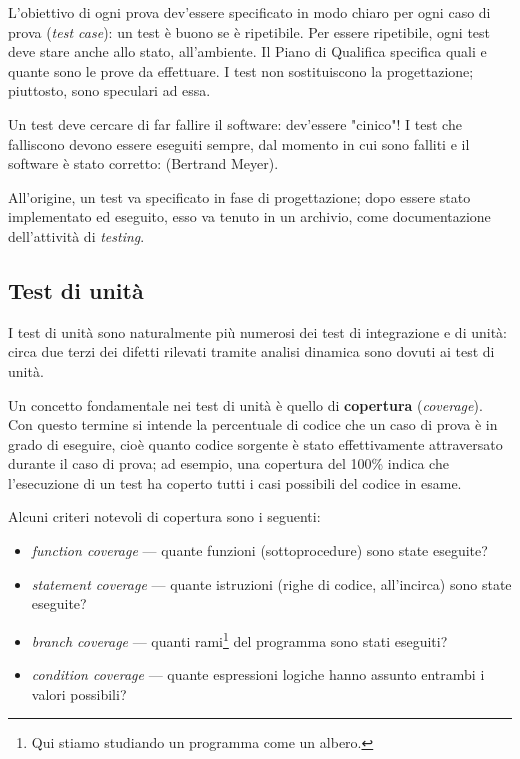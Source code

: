 \documentclass[a4paper]{article}
\begin{document}
		
L'obiettivo di ogni prova dev'essere specificato in modo chiaro per ogni caso di prova (\emph{test case}): un test è buono se è ripetibile. Per essere ripetibile, ogni test deve stare anche allo stato, all'ambiente. Il Piano di Qualifica specifica quali e quante sono le prove da effettuare. I test non sostituiscono la progettazione; piuttosto, sono speculari ad essa.
		
Un test deve cercare di far fallire il software: dev'essere "cinico"! I test che falliscono devono essere eseguiti sempre, dal momento in cui sono falliti e il software è stato corretto:  (Bertrand Meyer).
		
All'origine, un test va specificato in fase di progettazione; dopo essere stato implementato ed eseguito, esso va tenuto in un archivio, come documentazione dell'attività di \emph{testing}.

		
	\subsection{Test di unità}

		
I test di unità sono naturalmente più numerosi dei test di integrazione e di unità: circa due terzi dei difetti rilevati tramite analisi dinamica sono dovuti ai test di unità.
		
Un concetto fondamentale nei test di unità è quello di \textbf{copertura} (\emph{coverage}). Con questo termine si intende la percentuale di codice che un caso di prova è in grado di eseguire, cioè quanto codice sorgente è stato effettivamente attraversato durante il caso di prova; ad esempio, una copertura del 100\% indica che l'esecuzione di un test ha coperto tutti i casi possibili del codice in esame.
		
Alcuni criteri notevoli di copertura sono i seguenti:
		
	\begin{itemize}
		
			
	\item \emph{function coverage} --- quante funzioni (sottoprocedure) sono state eseguite?
			
	\item \emph{statement coverage} --- quante istruzioni (righe di codice, all'incirca) sono state eseguite?
			
	\item \emph{branch coverage} --- quanti rami\footnote{Qui stiamo studiando un programma come un albero.} del programma sono stati eseguiti?
			
	\item \emph{condition coverage} --- quante espressioni logiche hanno assunto entrambi i valori possibili?
		
	\end{itemize}
\end{document}
